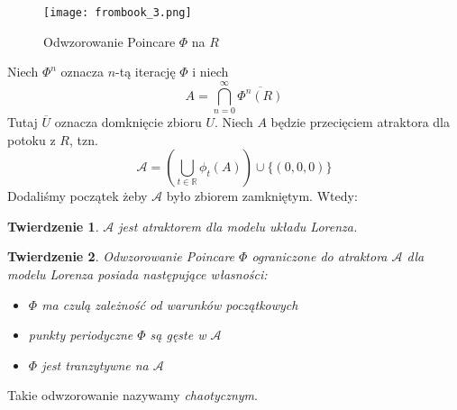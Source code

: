 \documentclass[12pt]{report}
\newtheorem{theorem}{Twierdzenie}
\newcommand{\R}{\mathbb{R}}
\begin{document}
	\begin{figure}[H]
		\centering
		\texttt{[image: frombook\_3.png]}
		\caption{Odwzorowanie Poincare $\Phi$ na $R$}
		\label{fig:frombook_3}
	\end{figure}
	\par Niech $\Phi^n$ oznacza $n$-tą iterację $\Phi$ i niech
		\[ A = \bigcap\limits^{\infty}_{n=0} \overline{\Phi^n(R)} \]
	Tutaj $\overline{U}$ oznacza domknięcie zbioru $U$. Niech $A$ będzie przecięciem atraktora dla potoku z $R$, tzn.
		\[ \mathcal{A} = (\bigcup\limits_{t \in \R} \phi_t(A)) \cup \{(0, 0, 0)\} \]
	Dodaliśmy początek żeby $\mathcal{A}$ było zbiorem zamkniętym. Wtedy:
	\begin{theorem}
		$\mathcal{A}$ jest atraktorem dla modelu układu Lorenza.
	\end{theorem}
	\begin{theorem}
		Odwzorowanie Poincare $\Phi$ ograniczone do atraktora $\mathcal{A}$ dla modelu Lorenza posiada następujące własności:
		\begin{itemize}
			\item $\Phi$ ma czulą zależność od warunków początkowych
			\item punkty periodyczne $\Phi$ są gęste w $\mathcal{A}$
			\item $\Phi$ jest tranzytywne na $\mathcal{A}$
		\end{itemize}
	\end{theorem}
	Takie odwzorowanie nazywamy \textit{chaotycznym}. \cite{HSD}
\end{document}
